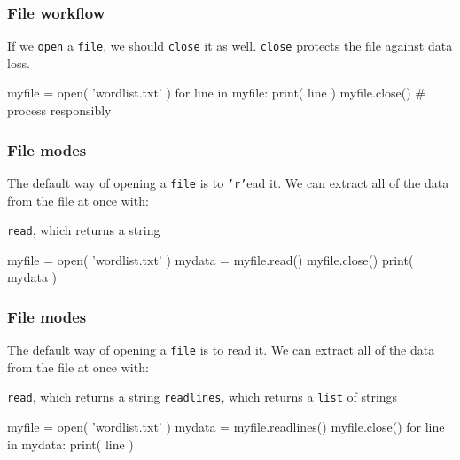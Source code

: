 \documentclass[11pt]{beamer}
\begin{document}
\begin{frame}[fragile]
  \frametitle{File workflow}
  \Enlarge

  \begin{itemize}
  \myitem  If we \texttt{open} a  \texttt{file}, we should \texttt{close} it as well. \pause
  \myitem  \texttt{close} protects the file against data loss. \pause
  \end{itemize}
  \begin{semiverbatim}
myfile = open( 'wordlist.txt' )
for line in myfile:
    print( line )
myfile.close()  # process responsibly
  \end{semiverbatim}
\end{frame}

\begin{frame}[fragile]
  \frametitle{File modes}
  \Enlarge

  \begin{itemize}
  \myitem  The default way of opening a \texttt{file} is to \texttt{'r'}ead it. \pause
  \myitem  We can extract all of the data from the file at once with:
    \begin{itemize}
    \mysubitem  \texttt{read}, which returns a string
    \end{itemize}
  \end{itemize}
  \begin{semiverbatim}
myfile = open( 'wordlist.txt' )
mydata = myfile.read()
myfile.close()
print( mydata )
  \end{semiverbatim}
\end{frame}

\begin{frame}[fragile]
  \frametitle{File modes}
  \Enlarge

  \begin{itemize}
  \myitem  The default way of opening a \texttt{file} is to read it.
  \myitem  We can extract all of the data from the file at once with:
    \begin{itemize}
    \mysubitem  \texttt{read}, which returns a string
    \mysubitem  \texttt{readlines}, which returns a \texttt{list} of strings
    \end{itemize}
  \end{itemize}
  \begin{semiverbatim}
myfile = open( 'wordlist.txt' )
mydata = myfile.readlines()
myfile.close()
for line in mydata:
    print( line )
  \end{semiverbatim}
\end{frame}
\end{document}
